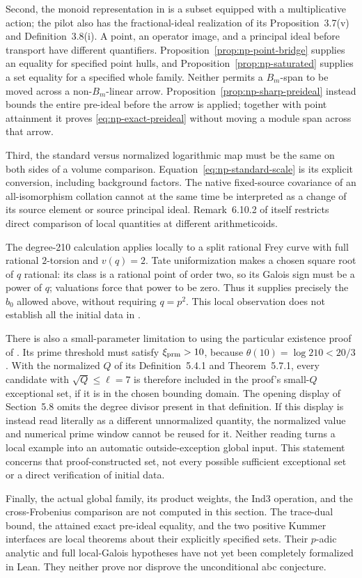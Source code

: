 Second, the monoid representation in
\cite[Theorem~3.11(i)(b), PDF pp.~153--154]{IUT3}
is a subset equipped with a multiplicative action;
the pilot also has the fractional-ideal realization of
its Proposition~3.7(v) and Definition~3.8(i).
A point, an operator image, and a principal ideal before
transport have different quantifiers.
Proposition~\ref{prop:np-point-bridge} supplies an equality
for specified point hulls, and
Proposition~\ref{prop:np-saturated} supplies a set equality
for a specified whole family. Neither permits a
$B_m$-span to be moved across a non-$B_m$-linear arrow.
Proposition~\ref{prop:np-sharp-preideal} instead
bounds the entire pre-ideal before the arrow is
applied; together with point attainment it proves
\eqref{eq:np-exact-preideal} without moving a module
span across that arrow.

Third, the standard versus normalized logarithmic map
must be the same on both sides of a volume comparison.
Equation~\eqref{eq:np-standard-scale} is its explicit
conversion, including background factors. The
native fixed-source covariance of an all-isomorphism
collation cannot at the same time be interpreted as
a change of its source element or source principal ideal.
Remark~6.10.2 of \cite{JoshiIV} itself restricts direct
comparison of local quantities at different arithmeticoids.

The degree-210 calculation applies locally to a split
rational Frey curve with full rational $2$-torsion and
$v(q)=2$. Tate uniformization
\cite[Theorem~C.14.1]{Silverman} makes a chosen square root
of $q$ rational: its class is a rational point of order
two, so its Galois sign must be a power of $q$; valuations
force that power to be zero. Thus it supplies precisely
the $b_0$ allowed above, without requiring $q=p^2$.
This local observation does not establish all the
initial data in \cite[Definition~3.1]{IUT1}.

There is also a small-parameter limitation to using the
particular existence proof of \cite[\S5.8]{JoshiIV}.
Its prime threshold must satisfy $\xi_{\rm prm}>10$,
because $\theta(10)=\log210<20/3$. With the normalized
$Q$ of its Definition~5.4.1 and Theorem~5.7.1,
every candidate with $\sqrt Q\le\ell=7$ is therefore
included in the proof's small-$Q$ exceptional set, if
it is in the chosen bounding domain. The opening display
of Section~5.8 omits the degree divisor present in that
definition. If this display is instead read literally
as a different unnormalized quantity, the normalized
value and numerical prime window cannot be reused for it.
Neither reading turns a local example into an automatic
outside-exception global input. This statement concerns
that proof-constructed set, not every possible sufficient
exceptional set or a direct verification of initial data.

Finally, the actual global family, its product weights,
the Ind3 operation, and the cross-Frobenius comparison
are not computed in this section. The trace-dual bound,
the attained exact pre-ideal equality, and the two positive
Kummer interfaces are local theorems
about their explicitly specified sets. Their $p$-adic
analytic and full local-Galois hypotheses have not yet
been completely formalized in Lean. They neither prove
nor disprove the unconditional abc conjecture.
